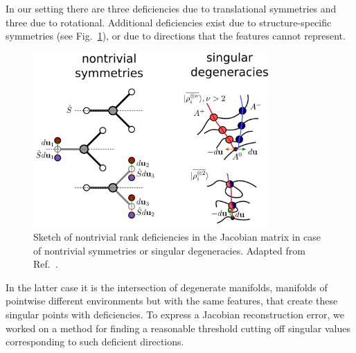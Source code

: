 In our setting there are three deficiencies due to translational symmetries and three due to rotational.
Additional deficiencies exist due to structure-specific symmetries (see Fig.~\ref{fig:jacobian-symmetry}), or due to directions that the features cannot represent.
\begin{figure}
    \centering\includegraphics[width=0.8\textwidth]{fig/jacobian_rank_deficiencies}
    \caption{Sketch of nontrivial rank deficiencies in the Jacobian matrix in case of nontrivial symmetries or singular degeneracies. Adapted from Ref.~\cite{localinvertibility2021pozdnyakov}.}
    \label{fig:jacobian-symmetry}
\end{figure}
In the latter case it is the intersection of degenerate manifolds, manifolds of pointwise different environments but with the same features, that create these singular points with deficiencies\cite{localinvertibility2021pozdnyakov}.
To express a Jacobian reconstruction error, we worked on a method for finding a reasonable threshold cutting off singular values corresponding to such deficient directions.

